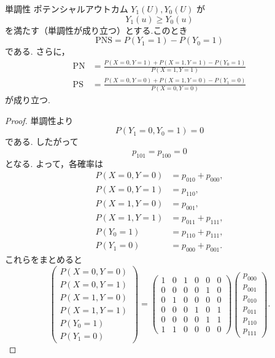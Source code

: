 \documentclass[uplatex, dvipdfmx]{jsarticle}
\begin{document}
\begin{thm}{単調性}
  ポテンシャルアウトカム $Y_1(U),Y_0(U)$ が
  \[
    Y_1(u)\ge Y_0(u)
  \]
  を満たす（単調性が成り立つ）とする.このとき
  \[
    \mathrm{PNS} = P(Y_1=1)-P(Y_0=1)
  \]
  である.
  さらに，
  \begin{align*}
    \mathrm{PN} &= \frac{P(X=0,Y=1)+P(X=1,Y=1)-P(Y_0=1)}{P(X=1,Y=1)} \\
    \mathrm{PS} &= \frac{P(X=0,Y=0)+P(X=1,Y=0)-P(Y_1=0)}{P(X=0,Y=0)}
  \end{align*}
  が成り立つ.
\end{thm}

\begin{proof}
  単調性より
  \[
    P(Y_1=0,Y_0=1)=0
  \]
  である.
  したがって
  \[
    p_{101}=p_{100}=0
  \]
  となる.
  よって，各確率は
  \begin{align*}
    P(X=0,Y=0) &= p_{010}+p_{000},\\
    P(X=0,Y=1) & =p_{110},\\
    P(X=1,Y=0) & =p_{001},\\
    P(X=1,Y=1) &= p_{011}+p_{111},\\
    P(Y_0=1) &= p_{110}+p_{111},\\
    P(Y_1=0)&= p_{000}+p_{001}.
  \end{align*}
  これらをまとめると
  \[
    \begin{pmatrix}
      P(X=0,Y=0)\\
      P(X=0,Y=1)\\
      P(X=1,Y=0)\\
      P(X=1,Y=1)\\
      P(Y_0=1)\\
      P(Y_1=0)
    \end{pmatrix}
    =
    \begin{pmatrix}
      1&0&1&0&0&0\\
      0&0&0&0&1&0\\
      0&1&0&0&0&0\\
      0&0&0&1&0&1\\
      0&0&0&0&1&1\\
      1&1&0&0&0&0
    \end{pmatrix}
    \begin{pmatrix}
      p_{000}\\
      p_{001}\\
      p_{010}\\
      p_{011}\\
      p_{110}\\
      p_{111}
    \end{pmatrix}.
\]
\end{proof}
\end{document}
